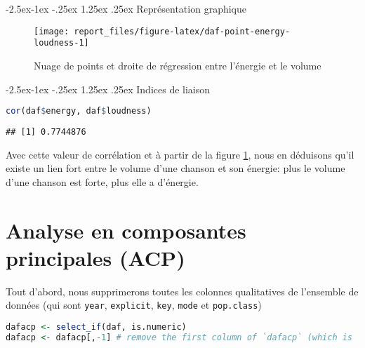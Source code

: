 \documentclass[
  11pt,
  xcolor = usenames,dvipsnames]{article}
\makeatletter
\newcommand{\passthrough}[1]{#1}
\renewcommand\paragraph{\@startsection{paragraph}{4}{\z@}%
        {-2.5ex\@plus -1ex \@minus -.25ex}%
        {1.25ex \@plus .25ex}%
        {\normalfont\normalsize\bfseries}}
\makeatother
\begin{document}
\hypertarget{repruxe9sentation-graphique-1}{%
\paragraph{Représentation graphique}\label{repruxe9sentation-graphique-1}}

\begin{figure}

{\centering \texttt{[image: report\_files/figure-latex/daf-point-energy-loudness-1]} 

}

\caption{Nuage de points et droite de régression entre l'énergie et le volume}\label{fig:daf-point-energy-loudness}
\end{figure}

\hypertarget{indices-de-liaison}{%
\paragraph{Indices de liaison}\label{indices-de-liaison}}

\begin{lstlisting}[language=R]
cor(daf$energy, daf$loudness)
\end{lstlisting}

\begin{lstlisting}
## [1] 0.7744876
\end{lstlisting}

Avec cette valeur de corrélation et à partir de la figure \ref{fig:daf-point-energy-loudness},
nous en déduisons qu'il existe un lien fort entre le volume d'une chanson et son énergie:
plus le volume d'une chanson est forte, plus elle a d'énergie.

\hypertarget{analyse-en-composantes-principales-acp}{%
\section{Analyse en composantes principales (ACP)}\label{analyse-en-composantes-principales-acp}}

Tout d'abord, nous supprimerons toutes les colonnes qualitatives de
l'ensemble de données (qui sont \passthrough{\lstinline!year!}, \passthrough{\lstinline!explicit!}, \passthrough{\lstinline!key!}, \passthrough{\lstinline!mode!} et \passthrough{\lstinline!pop.class!})

\begin{lstlisting}[language=R]
dafacp <- select_if(daf, is.numeric)
dafacp <- dafacp[,-1] # remove the first column of `dafacp` (which is `year`)
\end{lstlisting}
\end{document}
